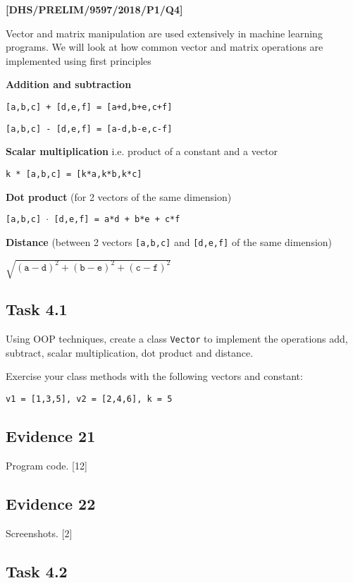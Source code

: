 \item \textbf{{[}DHS/PRELIM/9597/2018/P1/Q4{]} }

Vector and matrix manipulation are used extensively in machine learning
programs. We will look at how common vector and matrix operations
are implemented using first principles 

\textbf{Addition and subtraction}

\texttt{{[}a,b,c{]} + {[}d,e,f{]} = {[}a+d,b+e,c+f{]}}

\texttt{{[}a,b,c{]} - {[}d,e,f{]} = {[}a-d,b-e,c-f{]}}

\textbf{Scalar multiplication} i.e. product of a constant and a vector 

\texttt{k {*} {[}a,b,c{]} = {[}k{*}a,k{*}b,k{*}c{]}}

\textbf{Dot product} (for 2 vectors of the same dimension)

\texttt{{[}a,b,c{]} $\cdot$ {[}d,e,f{]} = a{*}d + b{*}e + c{*}f}

\textbf{Distance} (between 2 vectors \texttt{{[}a,b,c{]}} and \texttt{{[}d,e,f{]}}
of the same dimension) 

$\sqrt{\left(\mathtt{a-d}\right)^{2}+\left(\mathtt{b-e}\right)^{2}+\left(\mathtt{c-f}\right)^{2}}$

\subsection*{Task 4.1 }

Using OOP techniques, create a class \texttt{Vector} to implement
the operations add, subtract, scalar multiplication, dot product and
distance. 

Exercise your class methods with the following vectors and constant: 

\texttt{v1 = {[}1,3,5{]}, v2 = {[}2,4,6{]}, k = 5}

\subsection*{Evidence 21 }

Program code. \hfill{}{[}12{]}

\subsection*{Evidence 22}

Screenshots. \hfill{}{[}2{]}

\subsection*{Task 4.2}

